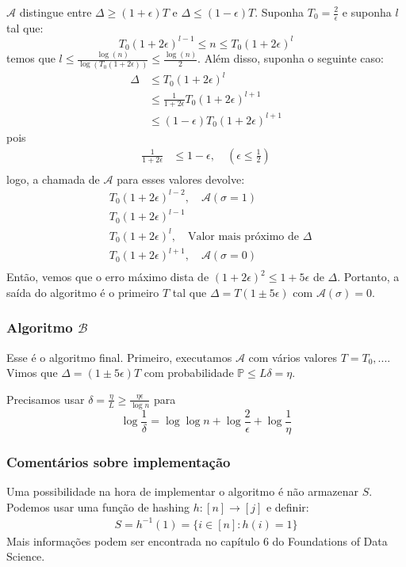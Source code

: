 $\mathcal{A}$ distingue entre $\Delta \geq (1+\epsilon)T$ e $\Delta \leq (1-\epsilon)T$. Suponha $T_0 =\frac{2}{\epsilon}$ e suponha $l$ tal que:
\begin{equation*}
    T_0(1 + 2\epsilon)^{l-1} \leq n \leq T_0(1 + 2\epsilon)^{l}
\end{equation*}
temos que $l \leq \frac{\log(n)}{\log(T_0(1 + 2\epsilon))} \leq \frac{\log(n)}{2}$. Além disso, suponha o seguinte caso:
\begin{align*}
    \Delta &\leq T_0(1 + 2\epsilon)^l\\
   &\leq \frac{1}{1+2\epsilon}T_0(1+2\epsilon)^{l+1}\\ 
   &\leq (1-\epsilon)T_0(1+2\epsilon)^{l+1}
\end{align*}
pois
\begin{align*}
    \frac{1}{1+2\epsilon} &\leq 1 - \epsilon, \quad (\epsilon \leq \frac{1}{2})\\
\end{align*}
logo, a chamada de $\mathcal{A}$ para esses valores devolve:
\begin{align*}
    &T_0(1+2\epsilon)^{l - 2}, \quad \mathcal{A}(\sigma = 1)\\
    &T_0(1+2\epsilon)^{l - 1}\\
    &T_0(1+2\epsilon)^{l},\quad \text{Valor mais próximo de $\Delta$}\\
    &T_0(1+2\epsilon)^{l + 1}, \quad \mathcal{A}(\sigma = 0)\\
\end{align*}
Então, vemos que o erro máximo dista de $(1 + 2\epsilon)^2 \leq 1 + 5\epsilon$ de $\Delta$. Portanto, a saída do algoritmo é o primeiro $T$ tal que $\Delta = T(1 \pm 5\epsilon)$ com $\mathcal{A}(\sigma)=0$.
\subsubsection{Algoritmo $\mathcal{B}$}Esse é o algoritmo final. Primeiro, executamos $\mathcal{A}$ com vários valores $T=T_0,...$. Vimos que $\Delta=(1 \pm 5\epsilon)T$ com probabilidade $\mathbb{P} \leq L\delta=\eta$.

Precisamos usar $\delta=\frac{\eta}{L}\geq\frac{\eta \epsilon}{\log{n}}$ para
\begin{equation*}
\log{\frac{1}{\delta}}=\log{\log{n}}+\log{\frac{2}{\epsilon}}+\log{\frac{1}{\eta}}
\end{equation*}

\subsubsection{Comentários sobre implementação}
Uma possibilidade na hora de implementar o algoritmo é não armazenar $S$. Podemos usar uma função de hashing $h:[n] \rightarrow [j]$ e definir:
\begin{align*}
    S = h^{-1}(1) = \{ i \in [n]: h(i) = 1\}
\end{align*}
Mais informações podem ser encontrada no capítulo 6 do Foundations of Data Science.


